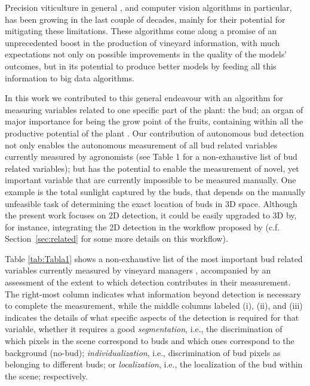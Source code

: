 \documentclass[a4paper,authoryear,review]{elsarticle}
\begin{document}
%
Precision viticulture in general \citep{bramley2004understanding, matese2015technology, ozdemir2017precision}, and computer vision algorithms \cite{seng2018computer} in particular, has been growing in the last couple of decades, mainly for their potential for mitigating these limitations. These algorithms come along a promise of an unprecedented boost in the production of vineyard information, with much expectations not only on possible improvements in the quality of the models’ outcomes, but   in its potential to produce better models by feeding all this information to big data algorithms. 

%
In this work we contributed to this general endeavour with an algorithm for measuring variables related to one specific part of the plant: the bud; an organ of major importance for being the  grow point of the fruits, containing within all the productive potential of the plant \citep{may2000bud, vasconcelos2009flowering, keller2020science}. Our contribution of  autonomous bud detection not only enables the autonomous measurement of all bud related variables currently measured by agronomists (see Table 1 for a non-exhaustive list of bud related variables); but has the potential to enable the measurement of novel, yet important variable  that are currently impossible to be measured manually. One example is the total sunlight captured by the buds, that depends on the manually unfeasible task of determining the exact location of buds in 3D space.  Although the present work focuses on 2D detection, it could be easily upgraded to 3D by, for instance, integrating the 2D detection in the workflow proposed by \cite{diaz2018grapevine} (c.f. Section~\ref{sec:related} for some more details on this workflow).

%
Table \ref{tab:Tabla1} shows a non-exhaustive list of the most important bud related variables currently measured by vineyard managers \citep{sanchez2005bud, noyce2016basis, collins2020effects}, accompanied by an assessment of the extent to which detection contributes in their measurement. The right-most column indicates what information beyond detection  is necessary to complete the measurement, while the middle columns labeled (i), (ii), and (iii) indicates the details of what specific aspects of the detection is required for that variable, whether it requires a good  \emph{segmentation}, i.e., the discrimination of which pixels in the scene correspond to buds and which ones correspond to the background (no-bud); \emph{individualization}, i.e., discrimination of bud pixels as belonging to different buds; or \emph{localization}, i.e., the localization of the bud within the scene; respectively.
\end{document}
